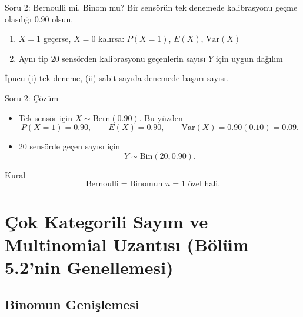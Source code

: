 \documentclass[light]{lutbeamer}
\begin{document}
\begin{frame}{Soru 2: Bernoulli mi, Binom mu?}
    \small
    Bir sensörün tek denemede kalibrasyonu geçme olasılığı \(0.90\) olsun.
    \begin{enumerate}
        \item[(i)] \(X=1\) geçerse, \(X=0\) kalırsa: \(P(X=1)\), \(E(X)\), \(\mathrm{Var}(X)\)
        \item[(ii)] Aynı tip \(20\) sensörden kalibrasyonu geçenlerin sayısı \(Y\) için uygun dağılım
    \end{enumerate}

    \begin{block}{İpucu}
        (i) tek deneme, (ii) sabit sayıda denemede başarı sayısı.
    \end{block}
\end{frame}

\begin{frame}{Soru 2: Çözüm}
    \small
    \begin{itemize}
        \item[(i)] Tek sensör için \(X\sim \mathrm{Bern}(0.90)\). Bu yüzden
        \[
        P(X=1)=0.90,\qquad E(X)=0.90,\qquad \mathrm{Var}(X)=0.90(0.10)=0.09.
        \]
        \item[(ii)] \(20\) sensörde geçen sayısı için
        \[
        Y\sim \mathrm{Bin}(20,0.90).
        \]
    \end{itemize}

    \begin{block}{Kural}
        \[
        \text{Bernoulli} = \text{Binomun } n=1 \text{ özel hali.}
        \]
    \end{block}
\end{frame}

\section{Çok Kategorili Sayım ve Multinomial Uzantısı (Bölüm 5.2'nin Genellemesi)}
\subsection{Binomun Genişlemesi}
\end{document}

